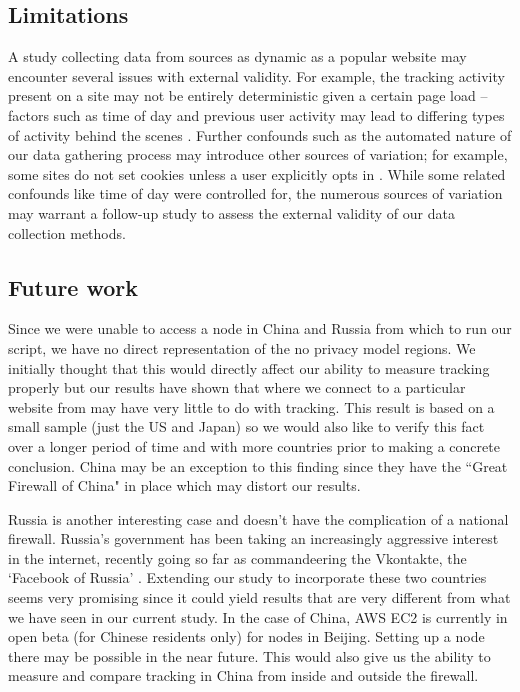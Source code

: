 \documentclass[conference]{IEEEtran}
\begin{document}
\subsection{Limitations}
A study collecting data from sources as dynamic as a popular website may encounter several issues with external validity. For example, the tracking activity present on a site may not be entirely deterministic given a certain page load -- factors such as time of day and previous user activity may lead to differing types of activity behind the scenes \cite{exchangewire}. Further confounds such as the automated nature of our data gathering process may introduce other sources of variation; for example, some sites do not set cookies unless a user explicitly opts in \cite{ico}. While some related confounds like time of day were controlled for, the numerous sources of variation may warrant a follow-up study to assess the external validity of our data collection methods.



\subsection{Future work}
Since we were unable to access a node in China and Russia from which to run our script, we have no direct representation of the no privacy model regions. We initially thought that this would directly affect our ability to measure tracking properly but our results have shown that where we connect to a particular website from may have very little to do with tracking. This result is based on a small sample (just the US and Japan) so we would also like to verify this fact over a longer period of time and with more countries prior to making a concrete conclusion. China may be an exception to this finding since they have the ``Great Firewall of China" in place which may distort our results. %

Russia is another interesting case and doesn't have the complication of a national firewall. Russia's government has been taking an increasingly aggressive interest in the internet, recently going so far as commandeering the Vkontakte, the `Facebook of Russia' \cite{toor}. Extending our study to incorporate these two countries seems very promising since it could yield results that are very different from what we have seen in our current study. In the case of China, AWS EC2 is currently in open beta (for Chinese residents only) for nodes in Beijing. Setting up a node there may be possible in the near future. This would also give us the ability to measure and compare tracking in China from inside and outside the firewall.
\end{document}
